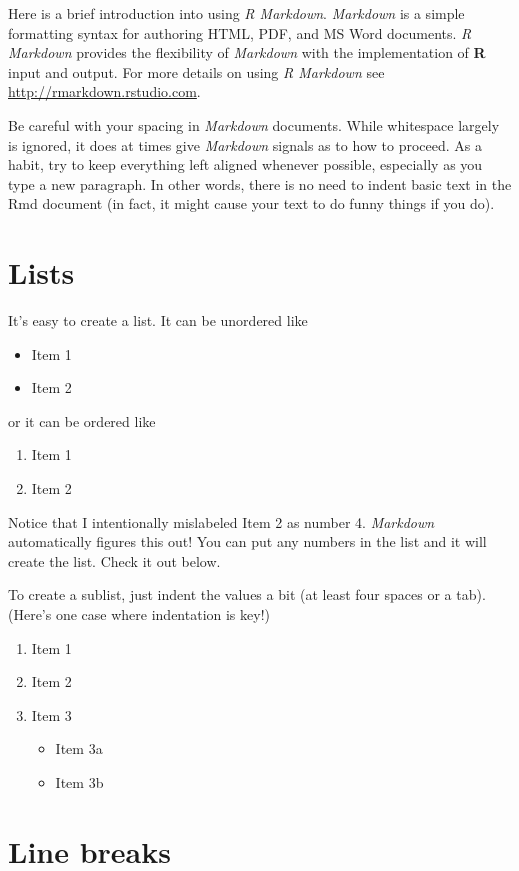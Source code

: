 \documentclass [11pt, proquest] {uwthesis}[2015/03/03]
\providecommand{\tightlist}{%
  \setlength{\itemsep}{0pt}\setlength{\parskip}{0pt}}
\begin{document}
Here is a brief introduction into using \emph{R Markdown}.
\emph{Markdown} is a simple formatting syntax for authoring HTML, PDF,
and MS Word documents. \emph{R Markdown} provides the flexibility of
\emph{Markdown} with the implementation of \textbf{R} input and output.
For more details on using \emph{R Markdown} see
\url{http://rmarkdown.rstudio.com}.

Be careful with your spacing in \emph{Markdown} documents. While
whitespace largely is ignored, it does at times give \emph{Markdown}
signals as to how to proceed. As a habit, try to keep everything left
aligned whenever possible, especially as you type a new paragraph. In
other words, there is no need to indent basic text in the Rmd document
(in fact, it might cause your text to do funny things if you do).

\section{Lists}\label{lists}

It's easy to create a list. It can be unordered like
\begin{itemize}
\tightlist
\item
  Item 1
\item
  Item 2
\end{itemize}
or it can be ordered like
\begin{enumerate}
\def\labelenumi{\arabic{enumi}.}
\tightlist
\item
  Item 1
\item
  Item 2
\end{enumerate}
Notice that I intentionally mislabeled Item 2 as number 4.
\emph{Markdown} automatically figures this out! You can put any numbers
in the list and it will create the list. Check it out below.

To create a sublist, just indent the values a bit (at least four spaces
or a tab). (Here's one case where indentation is key!)
\begin{enumerate}
\def\labelenumi{\arabic{enumi}.}
\tightlist
\item
  Item 1
\item
  Item 2
\item
  Item 3
  \begin{itemize}
  \tightlist
  \item
    Item 3a
  \item
    Item 3b
  \end{itemize}
\end{enumerate}
\section{Line breaks}\label{line-breaks}
\end{document}
